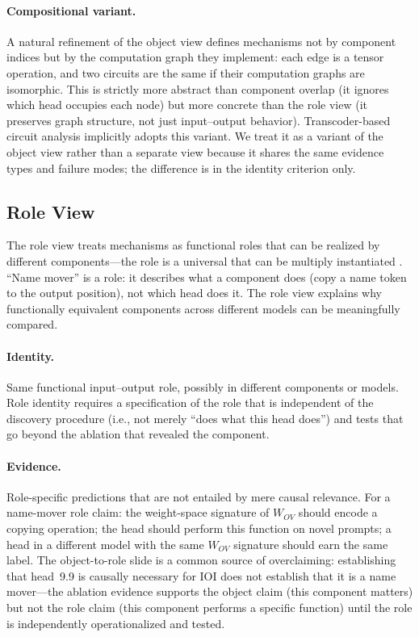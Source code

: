 \documentclass{article}
\begin{document}
\paragraph{Compositional variant.}
A natural refinement of the object view defines mechanisms not by
component indices but by the computation graph they implement: each edge
is a tensor operation, and two circuits are the same if their
computation graphs are isomorphic.  This is strictly more
abstract than component overlap (it ignores which head occupies each
node) but more concrete than the role view (it preserves graph
structure, not just input--output behavior).  Transcoder-based
circuit analysis implicitly adopts this variant.  We treat it as a
variant of the object view rather than a separate view because it
shares the same evidence types and failure modes; the difference is
in the identity criterion only.

\subsection{Role View}

The role view treats mechanisms as functional roles that can be realized
by different components---the role is a universal that can be multiply
instantiated \citep{lewis1972}.  ``Name mover'' is a role: it describes
what a component does (copy a name token to the output position), not
which head does it.  The role view explains why functionally equivalent
components across different models can be meaningfully compared.

\paragraph{Identity.}
Same functional input--output role, possibly in different components or
models.  Role identity requires a specification of the role that is
independent of the discovery procedure (i.e., not merely ``does what
this head does'') and tests that go beyond the ablation that revealed
the component.

\paragraph{Evidence.}
Role-specific predictions that are not entailed by mere causal relevance.
For a name-mover role claim: the weight-space signature of $W_{OV}$
should encode a copying operation; the head should perform this function
on novel prompts; a head in a different model with the same $W_{OV}$
signature should earn the same label.  The object-to-role slide is
a common source of overclaiming: establishing
that head~9.9 is causally necessary for IOI does not establish that it
is a name mover---the ablation evidence supports the object claim
(this component matters) but not the role claim (this component performs
a specific function) until the role is independently operationalized
and tested.
\end{document}
